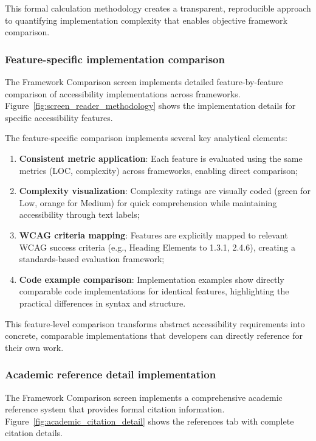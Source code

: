 This formal calculation methodology creates a transparent, reproducible approach to quantifying implementation complexity that enables objective framework comparison.

\subsubsection{Feature-specific implementation comparison}

The Framework Comparison screen implements detailed feature-by-feature comparison of accessibility implementations across frameworks. Figure~\ref{fig:screen_reader_methodology} shows the implementation details for specific accessibility features.

The feature-specific comparison implements several key analytical elements:

\begin{enumerate}
    \item \textbf{Consistent metric application}: Each feature is evaluated using the same metrics (LOC, complexity) across frameworks, enabling direct comparison;
    
    \item \textbf{Complexity visualization}: Complexity ratings are visually coded (green for Low, orange for Medium) for quick comprehension while maintaining accessibility through text labels;
    
    \item \textbf{WCAG criteria mapping}: Features are explicitly mapped to relevant WCAG success criteria (e.g., Heading Elements to 1.3.1, 2.4.6), creating a standards-based evaluation framework;
    
    \item \textbf{Code example comparison}: Implementation examples show directly comparable code implementations for identical features, highlighting the practical differences in syntax and structure.
\end{enumerate}

This feature-level comparison transforms abstract accessibility requirements into concrete, comparable implementations that developers can directly reference for their own work.

\subsubsection{Academic reference detail implementation}

The Framework Comparison screen implements a comprehensive academic reference system that provides formal citation information. Figure~\ref{fig:academic_citation_detail} shows the references tab with complete citation details.

